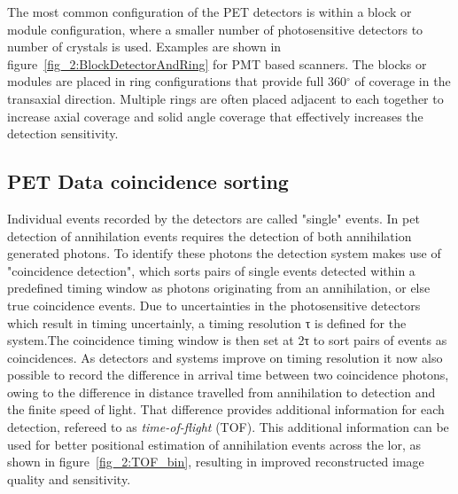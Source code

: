 %
The most common configuration of the PET detectors is within a block or module configuration, where a smaller number of photosensitive detectors to number of crystals is used. Examples are shown in figure~\ref{fig_2:BlockDetectorAndRing} for PMT based scanners.%
The blocks or modules are placed in ring configurations that provide full 360$^{\circ}$ of coverage in the transaxial direction. Multiple rings are often placed adjacent to each together to increase axial coverage and solid angle coverage that effectively increases the detection sensitivity. 

\subsection{PET Data coincidence sorting}
Individual events recorded by the detectors are called "single" events. In \gls{pet} detection of annihilation events requires the detection of both annihilation generated photons. To identify these photons the detection system makes use of "coincidence detection", which sorts pairs of single events detected within a predefined timing window as photons originating from an annihilation, or else true coincidence events. 
Due to uncertainties in the photosensitive detectors which result in timing uncertainly, a timing resolution τ is defined for the system.The coincidence timing window is then set at 2τ to sort pairs of events as coincidences.
As detectors and systems improve on timing resolution it now also possible to record the difference in arrival time between two coincidence photons, owing to the difference in distance travelled from annihilation to detection and the finite speed of light. That difference provides additional information for each detection, refereed to as \textit{time-of-flight} (TOF). This additional information can be used for better positional estimation of annihilation events across the \gls{lor}, as shown in figure~\ref{fig_2:TOF_bin}, resulting in improved reconstructed image quality and sensitivity.
%
%
